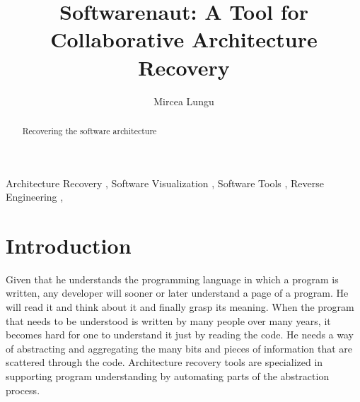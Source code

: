 \documentclass[preprint,12pt]{elsarticle}
\begin{document}
\begin{frontmatter}



\title{Softwarenaut: A Tool for Collaborative Architecture Recovery}


\author{Mircea Lungu}

\address{Software Composition Group\\University of Bern\\Switzerland}

\begin{abstract}
Recovering the software architecture
\end{abstract}

\begin{keyword}
Architecture Recovery \sep
Software Visualization \sep
Software Tools \sep
Reverse Engineering \sep
\end{keyword}

\end{frontmatter}


\section{Introduction}
\label{sec:Introduction}
Given that he understands the programming language in which a program 
is written, any developer will sooner or later understand a page of a 
program. He will read it and think about it and finally grasp its meaning.
When the program that needs to be understood is written by many people
over many years, it becomes hard for one to understand it just by reading
the code. He needs a way of abstracting and aggregating the many bits and
pieces of information that are scattered through the code. Architecture 
recovery tools are specialized in supporting program understanding by 
automating parts of the abstraction process. 
\end{document}
